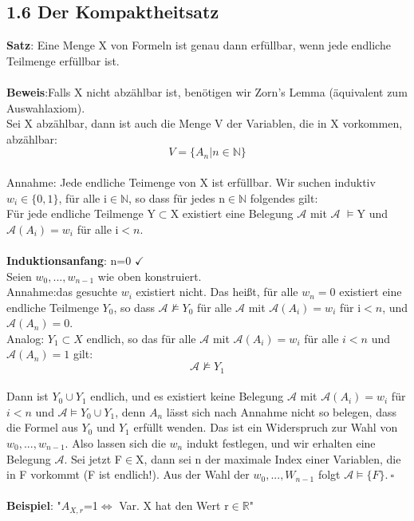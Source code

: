 \documentclass[a4paper]{scrartcl}
\begin{document}
\subsection*{1.6 Der Kompaktheitsatz}
\textbf{Satz}: Eine Menge X von Formeln ist genau dann erfüllbar, wenn jede endliche Teilmenge erfüllbar ist.\\ \\
\textbf{Beweis}:Falls X nicht abzählbar ist, benötigen wir Zorn's Lemma (äquivalent zum Auswahlaxiom).\\
Sei X abzählbar, dann ist auch die Menge V der Variablen, die in X vorkommen, abzählbar:\\
$$V=\{A_n|n\in\mathbb{N}\}$$\\
Annahme: Jede endliche Teimenge von X ist erfüllbar. Wir suchen induktiv $w_i\in \{0,1\}$, für alle i$\in \mathbb{N}$, so dass für jedes n$\in\mathbb{N}$ folgendes gilt:\\
Für jede endliche Teilmenge Y$\subset$X existiert eine Belegung $\mathcal{A}$ mit $\mathcal{A}$ $\models$Y und $\mathcal{A}(A_i)=w_i$ für alle i$<n$.\\ \\
\textbf{Induktionsanfang}: n=0 $\checkmark$\\
Seien $w_0,...,w_{n-1}$ wie oben konstruiert.\\
Annahme:das gesuchte $w_i$ existiert nicht. Das heißt, für alle $w_n=0$ existiert eine endliche Teilmenge $Y_0$, so dass $\mathcal{A}\not\models Y_0$ für alle $\mathcal{A}$ mit $\mathcal{A}(A_i)=w_i$ für i$<n$, und $\mathcal{A}(A_n)=0$.\\
Analog: $Y_1 \subset X$ endlich, so das für alle $\mathcal{A}$ mit $\mathcal{A}(A_i)=w_i$ für alle $i<n$ und $\mathcal{A}(A_n)=1$ gilt:\\
$$\mathcal{A} \not\models Y_1$$\\
Dann ist $Y_0\cup Y_1$ endlich, und es existiert keine Belegung $\mathcal{A}$ mit $\mathcal{A}(A_i)=w_i$ für $i<n$ und $\mathcal{A} \models Y_0 \cup Y_1$, denn $A_n$ lässt sich nach Annahme nicht so belegen, dass die Formel aus $Y_0$ und $Y_1$ erfüllt wenden. Das ist ein Widerspruch zur Wahl von $w_0,...,w_{n-1}$. Also lassen sich die $w_n$ indukt festlegen, und wir erhalten eine     Belegung $\mathcal{A}$. Sei jetzt F$\in$X, dann sei n der maximale Index einer Variablen, die in F vorkommt (F ist endlich!). Aus der Wahl der $w_0,...,W_{n-1}$ folgt $\mathcal{A}\models \{F\}.~\square$\\ \\
\textbf{Beispiel}: "$A_{X,r}$=1$\Leftrightarrow$ Var. X hat den Wert r$\in \mathbb{R}$"\\
\end{document}
